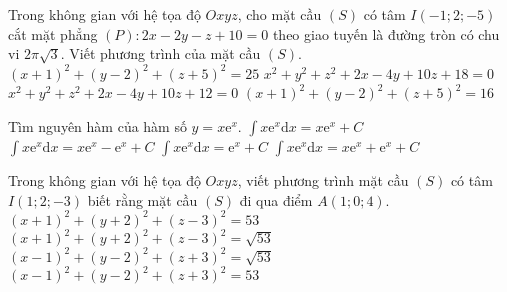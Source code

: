 \begin{ex}%
Trong không gian với hệ tọa độ $Oxyz$, cho mặt cầu $(S)$ có tâm $I(-1;2;-5)$ cắt mặt phẳng $(P):2x-2y-z+10=0$ theo giao tuyến là đường tròn có chu vi $2\pi\sqrt{3}$. Viết phương trình của mặt cầu $(S)$.
\choice
{$(x+1)^2+(y-2)^2+(z+5)^2=25$}
{\True $x^2+y^2+z^2+2x-4y+10z+18=0$}
{$x^2+y^2+z^2+2x-4y+10z+12=0$}
{$(x+1)^2+(y-2)^2+(z+5)^2=16$}
\end{ex}

\begin{ex}%
Tìm nguyên hàm của hàm số $y=x\mathrm{e}^x$.
\choice
{$\displaystyle\int x\mathrm{e}^x\mathrm{d}x=x\mathrm{e}^x+C$}
{\True $\displaystyle\int x\mathrm{e}^x\mathrm{d}x=x\mathrm{e}^x-\mathrm{e}^x+C$}
{$\displaystyle\int x\mathrm{e}^x\mathrm{d}x=\mathrm{e}^x+C$}
{$\displaystyle\int x\mathrm{e}^x\mathrm{d}x=x\mathrm{e}^x+\mathrm{e}^x+C$}
\end{ex}

\begin{ex}%
Trong không gian với hệ tọa độ $Oxyz$, viết phương trình mặt cầu $(S)$ có tâm $I(1;2;-3)$ biết rằng mặt cầu $(S)$ đi qua điểm $A(1;0;4)$.
\choice
{$(x+1)^2+(y+2)^2+(z-3)^2=53$}
{$(x+1)^2+(y+2)^2+(z-3)^2=\sqrt{53}$}
{$(x-1)^2+(y-2)^2+(z+3)^2=\sqrt{53}$}
{\True $(x-1)^2+(y-2)^2+(z+3)^2=53$}
\end{ex}

